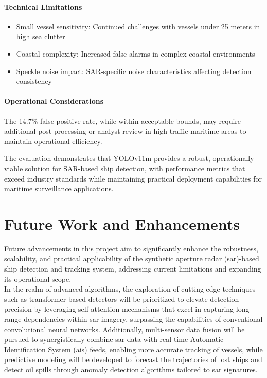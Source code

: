 \documentclass{article}
\begin{document}
	\paragraph{Technical Limitations}
	\begin{itemize}
		\item Small vessel sensitivity: Continued challenges with vessels under 25 meters in high sea clutter
		\item Coastal complexity: Increased false alarms in complex coastal environments
		\item Speckle noise impact: SAR-specific noise characteristics affecting detection consistency
	\end{itemize}
	
	\paragraph{Operational Considerations}
	The 14.7\% false positive rate, while within acceptable bounds, may require additional post-processing or analyst review in high-traffic maritime areas to maintain operational efficiency.
	
	\bigskip
	The evaluation demonstrates that YOLOv11m provides a robust, operationally viable solution for SAR-based ship detection, with performance metrics that exceed industry standards while maintaining practical deployment capabilities for maritime surveillance applications.
	
	
	
	\newpage
	\section{Future Work and Enhancements}
	Future advancements in this project aim to significantly enhance the robustness, scalability, and practical applicability of the synthetic aperture radar (\acrshort{sar})-based ship detection and tracking system, addressing current limitations and expanding its operational scope.\\
	
	In the realm of advanced algorithms, the exploration of cutting-edge techniques such as transformer-based detectors will be prioritized to elevate detection precision by leveraging self-attention mechanisms that excel in capturing long-range dependencies within \acrshort{sar} imagery, surpassing the capabilities of conventional convolutional neural networks. Additionally, multi-sensor data fusion will be pursued to synergistically combine \acrshort{sar} data with real-time Automatic Identification System (\acrshort{ais}) feeds, enabling more accurate tracking of vessels, while predictive modeling will be developed to forecast the trajectories of lost ships and detect oil spills through anomaly detection algorithms tailored to \acrshort{sar} signatures. \\
	
\end{document}
